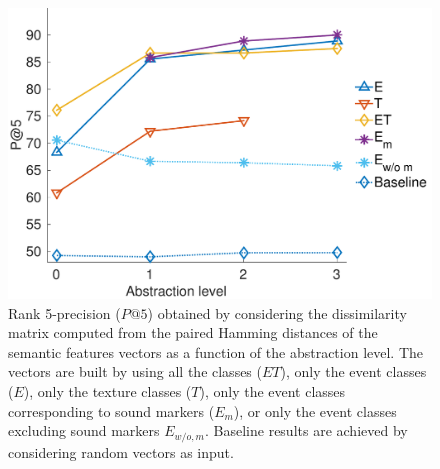 \documentclass[12pt]{elsarticle}
\newcommand{\cf}{cf.}
\newcommand{\myfloatalign}{\centering}
\begin{document}
\begin{figure}[t]
  \myfloatalign
  \includegraphics[width=\linewidth]{gfx/pa5_1_en}
  \caption{Rank 5-precision ($P@5$) obtained by considering the dissimilarity matrix computed from the paired Hamming distances of the semantic features vectors as a function of the abstraction level. The vectors are built by using all the classes ($ET$), only the event classes ($E$), only the texture classes ($T$), only the event classes corresponding to sound markers ($E_m$), or only the event classes excluding sound markers $E_{w/o,m}$. Baseline results are achieved by considering random vectors as input.}\label{fig:pa5}
\end{figure}

\end{document}
